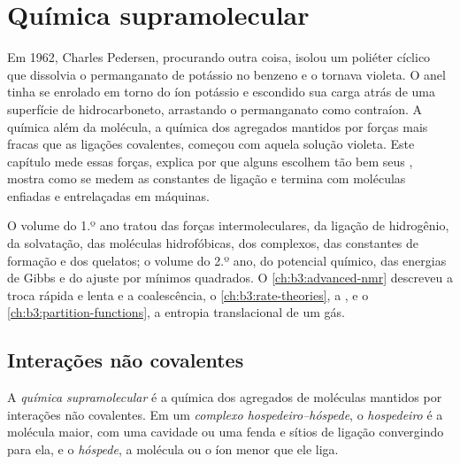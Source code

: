 \chapter{Química supramolecular}\label{ch:b3:supramolecular}

Em 1962, Charles Pedersen, procurando outra coisa, isolou um poliéter
cíclico que dissolvia o permanganato de potássio no benzeno e o tornava
violeta. O anel tinha se enrolado em torno do íon potássio e escondido sua
carga atrás de uma superfície de hidrocarboneto, arrastando o permanganato como
contraíon. A química além da molécula, a química dos agregados mantidos
por forças mais fracas que as ligações covalentes, começou com aquela solução violeta.
Este capítulo mede essas forças, explica por que alguns  escolhem tão bem seus ,
mostra como se medem as constantes de ligação e termina com moléculas
enfiadas e entrelaçadas em máquinas.

\begin{recall}
O volume do 1.º ano tratou das forças intermoleculares, da ligação de hidrogênio, da solvatação,
das moléculas hidrofóbicas, dos complexos, das constantes de formação e dos quelatos; o volume do
2.º ano, do potencial químico, das energias de Gibbs e do ajuste por mínimos quadrados.
O \cref{ch:b3:advanced-nmr} descreveu a troca rápida e lenta e a coalescência,
o \cref{ch:b3:rate-theories}, a , e o
\cref{ch:b3:partition-functions}, a entropia translacional de um gás.
\end{recall}

\section{Interações não covalentes}

\begin{definition}\label{def:b3:supramolecular:supramolecular}
A \emph{química supramolecular} é a química
dos agregados de moléculas mantidos por interações não covalentes. Em um
\emph{complexo hospedeiro--hóspede}, o \emph{hospedeiro}
é a molécula maior, com uma cavidade ou uma fenda e sítios de ligação convergindo para
ela, e o \emph{hóspede}, a molécula ou o íon menor que ele liga.
\end{definition}

